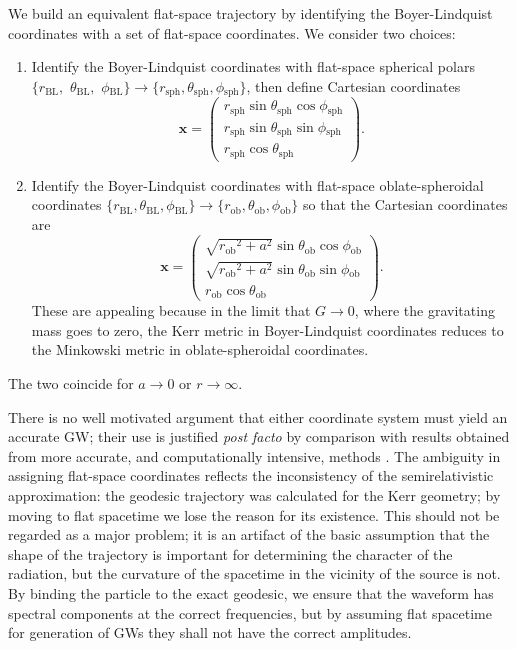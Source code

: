 \documentclass[useAMS,usedcolumn,usegraphicx,usenatbib]{mn2e}
\newcommand{\sub}[1]{\ensuremath{_\mathrm{#1}}}
\begin{document}
We build an equivalent flat-space trajectory by identifying the Boyer-Lindquist coordinates with a set of flat-space coordinates. We consider two choices:
\begin{enumerate}
\item Identify the Boyer-Lindquist coordinates with flat-space spherical polars $\{r\sub{BL},$ $\theta\sub{BL},$ $\phi\sub{BL}\} \rightarrow \{r\sub{sph}, \theta\sub{sph}, \phi\sub{sph}\}$, then define Cartesian coordinates \citep{Gair2005, Babak2007}
\begin{equation}
\boldsymbol{x} = \begin{pmatrix}
r\sub{sph} \sin\theta\sub{sph}\cos\phi\sub{sph} \\
r\sub{sph} \sin\theta\sub{sph}\sin\phi\sub{sph} \\
r\sub{sph} \cos\theta\sub{sph}
\end{pmatrix}.
\end{equation}
\item Identify the Boyer-Lindquist coordinates with flat-space oblate-spheroidal coordinates $\{r\sub{BL}, \theta\sub{BL}, \phi\sub{BL}\} \rightarrow \{r\sub{ob}, \theta\sub{ob}, \phi\sub{ob}\}$ so that the Cartesian coordinates are
\begin{equation}
\boldsymbol{x} = \begin{pmatrix}
\sqrt{{r\sub{ob}}^2 + a^2} \sin\theta\sub{ob}\cos\phi\sub{ob} \\
\sqrt{{r\sub{ob}}^2 + a^2} \sin\theta\sub{ob}\sin\phi\sub{ob} \\
r\sub{ob} \cos\theta\sub{ob}
\end{pmatrix}.
\end{equation}
These are appealing because in the limit that $G \rightarrow 0$, where the gravitating mass goes to zero, the Kerr metric in Boyer-Lindquist coordinates reduces to the Minkowski metric in oblate-spheroidal coordinates.
\end{enumerate}
The two coincide for $a \rightarrow 0$ or $r \rightarrow \infty$.

There is no well motivated argument that either coordinate system must yield an accurate GW; their use is justified {\it post facto} by comparison with results obtained from more accurate, and computationally intensive, methods \citep{Gair2005, Babak2007}. The ambiguity in assigning flat-space coordinates reflects the inconsistency of the semirelativistic approximation: the geodesic trajectory was calculated for the Kerr geometry; by moving to flat spacetime we lose the reason for its existence. This should not be regarded as a major problem; it is an artifact of the basic assumption that the shape of the trajectory is important for determining the character of the radiation, but the curvature of the spacetime in the vicinity of the source is not. By binding the particle to the exact geodesic, we ensure that the waveform has spectral components at the correct frequencies, but by assuming flat spacetime for generation of GWs they shall not have the correct amplitudes.
\end{document}
